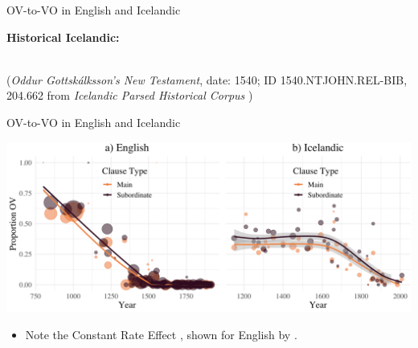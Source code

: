 \documentclass[hyperref={pdfpagelabels=false}]{beamer}
\begin{document}
\begin{frame}{OV-to-VO in English and Icelandic} 
	
	\textbf{Historical Icelandic:}%
	\begin{exe}\ex \label{ex:ntov}\begin{xlist}
			\\\vspace{2mm}
			\small{(\textit{\small{Oddur Gottskálksson's New Testament}}, date: 1540; ID 1540.NTJOHN.REL-BIB, 204.662 from \textsl{Icelandic Parsed Historical Corpus} \citep{icepahc09})}\\\vspace{5mm}
		\end{xlist}
	\end{exe}
	

	
\end{frame}

\begin{frame}{OV-to-VO in English and Icelandic} 
	

	\includegraphics[width=1.04\textwidth]{FullClauseFig.png}
	\begin{itemize}
	\item Note the Constant Rate Effect \citep{kroch1989}, shown for English by \citet{pintzuktaylor2006}.
\end{itemize}	
\end{frame}
\end{document}
